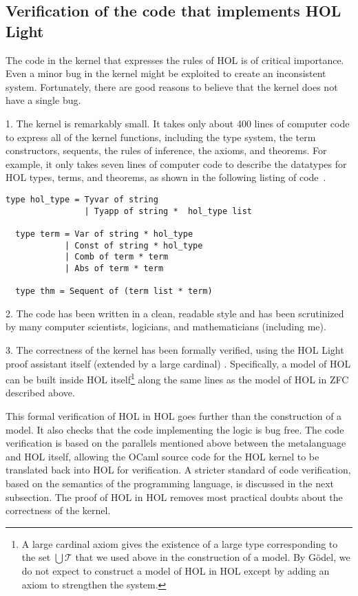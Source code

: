 \documentclass[brochure,english,12pt]{bourbaki}
\theoremstyle{plain}
\def\T{{\mathcal T}}
\begin{document}
\subsection{Verification of the code that implements HOL Light}

The code in the kernel that expresses the rules of HOL is of critical importance.  
Even a minor bug in the kernel might be exploited to create an inconsistent system.  Fortunately,
there are good reasons to believe that the kernel does not have a single bug.

1.  The kernel is remarkably small.  It takes only about 400 lines of computer code to express
all of the kernel functions, including the type system, the term constructors, sequents, the rules of inference,
the axioms, and theorems.  For example, it only takes seven lines of computer code to describe the datatypes
for HOL types, terms, and theorems, as shown in the following listing of code~\cite{HOLL}.

\begin{lstlisting}[keepspaces=true,stringstyle=\tt,basicstyle=\small,frame=single,framesep=8pt,mathescape,morekeywords={type},columns=flexible]
  type hol_type = Tyvar of string
                | Tyapp of string *  hol_type list

  type term = Var of string * hol_type
            | Const of string * hol_type
            | Comb of term * term
            | Abs of term * term

  type thm = Sequent of (term list * term)
\end{lstlisting}

2.  The code has been written in a clean, readable style and has been scrutinized by many computer scientists,
logicians, and mathematicians (including me).

3.  The correctness of the kernel has been formally verified, using the HOL Light proof assistant itself (extended by a large
cardinal) \cite{HaSelf}.  Specifically,
a model of HOL can be built inside HOL itself\footnote{A large cardinal axiom 
 gives the existence of a large type corresponding to the set $\bigcup\T$ that we used above in the construction of a model.
By G\"odel, we do not expect to construct a model of HOL in HOL except by 
adding an axiom to strengthen the system.} along the same
lines as the model of HOL in ZFC described above.  

This formal verification of HOL in HOL goes  further than the construction of a model.
It also checks that the code implementing the logic is bug free.  The code verification is based on the 
parallels mentioned above between the metalanguage and HOL itself, allowing the OCaml source code for the HOL kernel to be
translated back into HOL for verification.  A stricter standard of code verification, based
on the semantics of the programming language, is discussed in the next subsection.
The proof of HOL in HOL removes most practical doubts about the correctness of the kernel.
\end{document}
